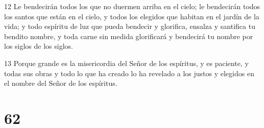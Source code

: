 \par 12 Le bendecirán todos los que no duermen arriba en el cielo; le bendecirán todos los santos que están en el cielo, y todos los elegidos que habitan en el jardín de la vida; y todo espíritu de luz que pueda bendecir y glorifica, ensalza y santifica tu bendito nombre, y toda carne sin medida glorificará y bendecirá tu nombre por los siglos de los siglos.
\par 13 Porque grande es la misericordia del Señor de los espíritus, y es paciente, y todas sus obras y todo lo que ha creado lo ha revelado a los justos y elegidos en el nombre del Señor de los espíritus.

\chapter{62}

